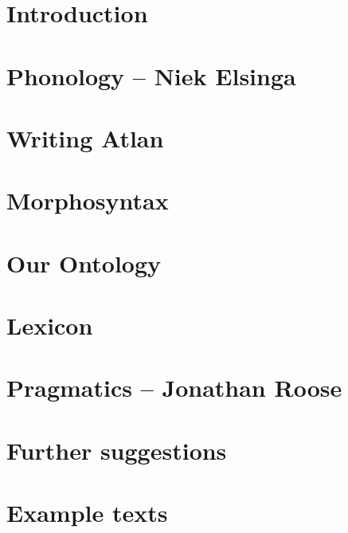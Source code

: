 \documentclass[twoside, openany, 12pt, a5paper]{book}
\begin{document}
\frontmatter






\mainmatter

\restoregeometry
\chapter{Introduction}

\chapter{Phonology -- {\small Niek Elsinga}}

\chapter{Writing Atlan}

\chapter{Morphosyntax}

\chapter{Our Ontology}

\chapter{Lexicon}


\chapter{Pragmatics -- {\small Jonathan Roose}}

\chapter{Further suggestions}

\chapter{Example texts}
\end{document}
